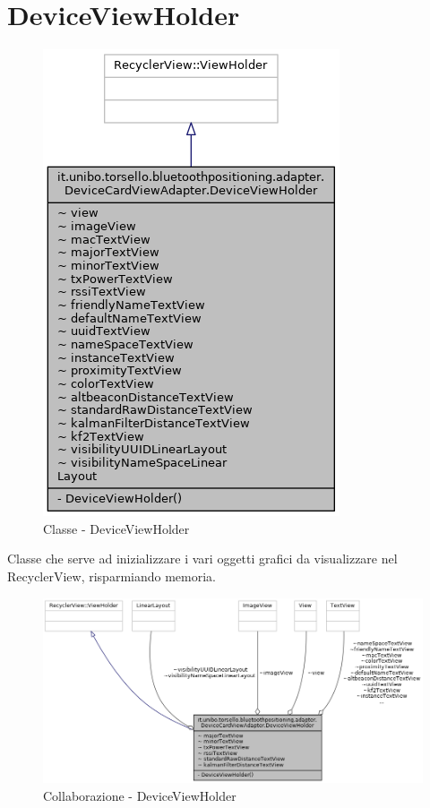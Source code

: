 \newpage
\section{DeviceViewHolder}
\begin{figure}[ph]
	\centering
	\includegraphics[width=0.5\linewidth]{img/uml/class/classit_1_1unibo_1_1torsello_1_1bluetoothpositioning_1_1adapter_1_1DeviceCardViewAdapter_1_1DeviceViewHolder__inherit__graph.png}
	\caption{Classe - DeviceViewHolder}
\end{figure}

Classe che serve ad inizializzare i vari oggetti grafici da visualizzare nel RecyclerView, risparmiando memoria.

\begin{figure}[ph]
	\centering
	\includegraphics[width=1.5\linewidth,angle=90]{img/uml/class/classit_1_1unibo_1_1torsello_1_1bluetoothpositioning_1_1adapter_1_1DeviceCardViewAdapter_1_1DeviceViewHolder__coll__graph.png}
	\caption{Collaborazione - DeviceViewHolder}
\end{figure}

